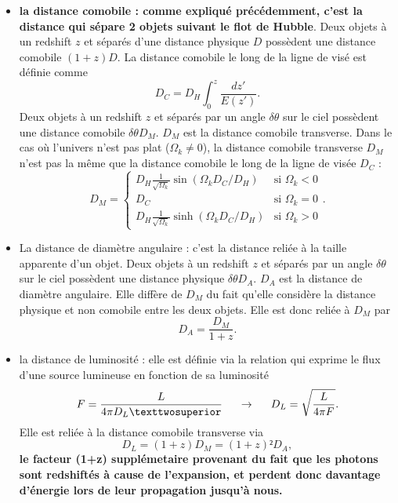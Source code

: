 \documentclass[11pt, twoside, a4paper, openright]{report}
\begin{document}
\begin{itemize}[label=$\bullet$]
\item \textbf{la distance comobile : comme expliqué précédemment, c'est la distance qui sépare 2 objets suivant le flot de Hubble}. Deux objets à un redshift $z$ et séparés d'une distance physique $D$ possèdent une distance comobile $(1+z)D$. La distance comobile le long de la ligne de visé est définie comme
  \begin{equation}
    \label{eq:dist_como}
    D_{C} = D_H \int_0^z \frac{dz'}{E(z')} .
  \end{equation}
  Deux objets à un redshift $z$ et séparés par un angle $\delta \theta$ sur le ciel possèdent une distance comobile $\delta \theta D_M$. $D_M$ est la distance comobile transverse. 
  Dans le cas où l'univers n'est pas plat ($\Omega_k \neq 0$), la distance comobile transverse $D_M$  n'est pas la même que la distance comobile le long de la ligne de visée $D_{C}$ :
  \begin{equation}
    \label{eq:dist_como_trans}
    D_M = \left\{
      \begin{array}{ll}
        D_H \frac{1}{\sqrt{\Omega_k}} \sin(\Omega_k D_C / D_H) & \mbox{si } \Omega_k < 0 \\
        D_C & \textrm{si } \Omega_k = 0 \\
        D_H \frac{1}{\sqrt{\Omega_k}} \sinh(\Omega_k D_C / D_H) & \mbox{si } \Omega_k > 0
      \end{array}
    \right..
  \end{equation}
  
\item La distance de diamètre angulaire : c'est la distance reliée à la taille apparente d'un objet. Deux objets à un redshift $z$ et séparés par un angle $\delta \theta$ sur le ciel possèdent une distance physique $\delta \theta D_A$. $D_A$ est la distance de diamètre angulaire. Elle diffère de $D_M$ du fait qu'elle considère la distance physique et non comobile entre les deux objets. Elle est donc reliée à $D_M$ par
  \begin{equation}
    \label{eq:dist_ang}
    D_A = \frac{D_M}{1+z}.
  \end{equation}

\item la distance de luminosité : elle est définie via la relation qui exprime le flux d'une source lumineuse en fonction de sa luminosité
  \begin{equation}
    \label{eq:dist_lum}
    F = \frac{L}{4\pi D_L²} \hspace{0.5cm} \rightarrow \hspace{0.5cm} D_L = \sqrt{\frac{L}{4 \pi F}} .
  \end{equation}
  Elle est reliée à la distance comobile transverse via
  \begin{equation}
    D_L = (1+z) D_M = (1+z)² D_A ,
  \end{equation}
\textbf{le facteur (1+z) supplémetaire provenant du fait que les photons sont redshiftés à cause de l'expansion, et perdent donc davantage d'énergie lors de leur propagation jusqu'à nous.}
\end{itemize}
\end{document}
